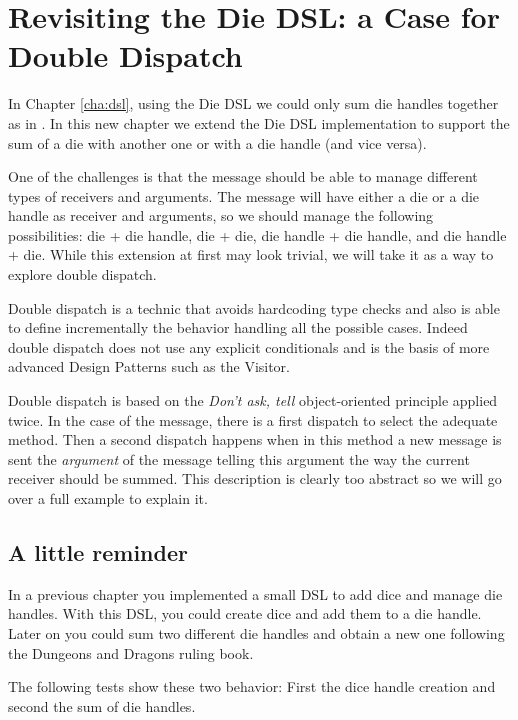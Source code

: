 \documentclass[10pt,twoside,english]{_support/latex/sbabook/sbabook}
\begin{document}
\frontmatter
\pagestyle{plain}

\tableofcontents*
\clearpage\listoffigures

\mainmatter

\chapter{Revisiting the Die DSL: a Case for Double Dispatch}\label{ch:doubleDispatch}
In Chapter \ref{cha:dsl}, using the Die DSL we could only sum die handles together as in . In this new chapter we extend the Die DSL implementation to support the sum of a die with another one or with a die handle (and vice versa). 

One of the challenges is that the message \textcode{+} should be able to manage different types of receivers and arguments. The message will have either a die or a die handle as receiver and arguments, so we should manage the following possibilities: die + die handle, die + die, die handle + die handle, and die handle + die. While this extension at first may look trivial, we will take it as a way to explore double dispatch. 

Double dispatch is a technic that avoids hardcoding type checks and also is able to define incrementally the behavior handling all the possible cases. Indeed double dispatch does not use any explicit conditionals and is the basis of more advanced Design Patterns such as the Visitor. 

Double dispatch is based on the \textit{Don't ask, tell} object-oriented principle applied twice. In the case of the \textcode{+} message, there is a first dispatch to select the adequate method. Then a second dispatch happens when in this method a new message is sent the \textit{argument} of the \textcode{+} message telling this argument the way the current receiver should be summed. This description is clearly too abstract so we will go over a full example to explain it. 
\section{A little reminder}
In a previous chapter you implemented a small DSL to add dice and manage die handles. With this DSL, you could create dice and add them to a die handle. Later on you could sum two different die handles and obtain a new one following the Dungeons and Dragons ruling book. 

The following tests show these two behavior: First the dice handle creation and second the sum of die handles.
\end{document}
